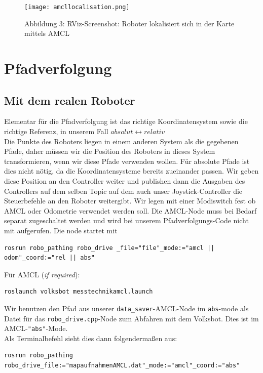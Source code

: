 \documentclass[11pt,a4paper]{article}
\begin{document}
\begin{figure}[H]
  \caption*{Abbildung 3: RViz-Screenshot: Roboter lokalisiert sich in der Karte mittels AMCL}
  \texttt{[image: amcllocalisation.png]}
  \centering
\end{figure}

\section{Pfadverfolgung}
\subsection*{Mit dem realen Roboter}
Elementar für die Pfadverfolgung ist das richtige Koordinatensystem sowie die richtige Referenz, in unserem Fall $absolut \leftrightarrow relativ$ \\
Die Punkte des Roboters liegen in einem anderen System als die gegebenen Pfade, daher müssen
wir die Position des Roboters in dieses System transformieren, wenn wir diese Pfade verwenden wollen. 
Für absolute Pfade ist dies nicht nötig, da die Koordinatensysteme bereits zueinander passen. 
Wir geben diese Position an den Controller weiter und publishen dann die Ausgaben des Controllers auf dem 
selben Topic auf dem auch unser Joystick-Controller die Steuerbefehle an den Roboter weitergibt. 
Wir legen mit einer Modiswitch fest ob AMCL oder Odometrie verwendet werden soll. Die AMCL-Node muss 
bei Bedarf separat zugeschaltet werden und wird bei unserem Pfadverfolgungs-Code nicht mit aufgerufen.
Die node startet mit \begin{verbatim}
rosrun robo_pathing robo_drive _file="file"_mode:="amcl || odom"_coord:="rel || abs"
\end{verbatim}
Für AMCL (\textit{if required}):
\begin{verbatim}
roslaunch volksbot messtechnikamcl.launch
\end{verbatim}
Wir benutzen den Pfad aus unserer \verb|data_saver|-AMCL-Node im \texttt{abs}-mode als Datei
für das \verb|robo_drive.cpp|-Node zum Abfahren mit dem Volksbot. Dies ist im AMCL-\texttt{"abs"}-Mode. \\
Als Terminalbefehl sieht dies dann folgendermaßen aus:
\begin{verbatim}
rosrun robo_pathing robo_drive_file:="mapaufnahmenAMCL.dat"_mode:="amcl"_coord:="abs"
\end{verbatim}
\end{document}
